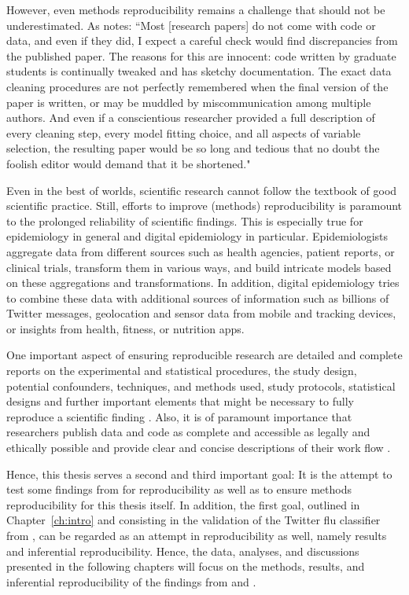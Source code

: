 \documentclass[11pt, a4paper,twoside]{report}\usepackage[]{graphicx}\usepackage[]{color}
\begin{document}
However, even methods reproducibility remains a challenge that should not be underestimated. As \cite{banks_reproducible_2011} notes: ``Most [research papers] do not come with code or data, and even if they did, I expect a careful check would find discrepancies from the published paper. The reasons for this are innocent: code written by graduate students is continually tweaked and has sketchy documentation. The exact data cleaning procedures are not perfectly remembered when the final version of the paper is written, or may be muddled by miscommunication among multiple authors. And even if a conscientious researcher provided a full description of every cleaning step, every model fitting choice, and all aspects of variable selection, the resulting paper would be so long and tedious that no doubt the foolish editor would demand that it be shortened."

Even in the best of worlds, scientific research cannot follow the textbook of good scientific practice. Still, efforts to improve (methods) reproducibility is paramount to the prolonged reliability of scientific findings. This is especially true for epidemiology in general and digital epidemiology in particular. Epidemiologists aggregate data from different sources such as health agencies, patient reports, or clinical trials, transform them in various ways, and build intricate models based on these aggregations and transformations. In addition, digital epidemiology tries to combine these data with additional sources of information such as billions of Twitter messages, geolocation and sensor data from mobile and tracking devices, or insights from health, fitness, or nutrition apps. 

One important aspect of ensuring reproducible research are detailed and complete reports on the experimental and statistical procedures, the study design, potential confounders, techniques, and methods used, study protocols, statistical designs and further important elements that might be necessary to fully reproduce a scientific finding \citep{kass_ten_2016}. Also, it is of paramount importance that researchers publish data and code as complete and accessible as legally and ethically possible and provide clear and concise descriptions of their work flow \citep{peng_reproducible_2006}.

Hence, this thesis serves a second and third important goal: It is the attempt to test some findings from \cite{bodnar_data_2015} for reproducibility as well as to ensure methods reproducibility for this thesis itself. In addition, the first goal, outlined in Chapter~\ref{ch:intro} and consisting in the validation of the Twitter flu classifier from \cite{bodnar_ground_2014}, can be regarded as an attempt in reproducibility as well, namely results and inferential reproducibility. Hence, the data, analyses, and discussions presented in the following chapters will focus on the methods, results, and inferential reproducibility of the findings from \cite{bodnar_ground_2014} and \cite{bodnar_data_2015}.
\end{document}
